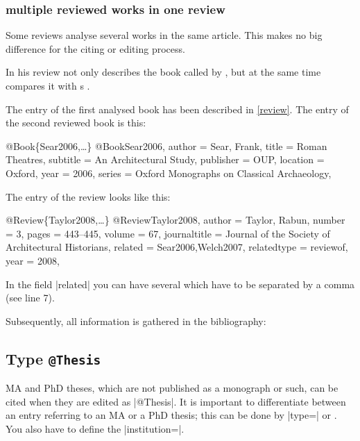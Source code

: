 \documentclass[a4paper,
10pt,
greek,
french,
spanish,
italian,
ngerman,
english
]{ltxdoc}
\begin{document}


\subsubsection{multiple reviewed works in one review}
Some reviews analyse several works in the same article. 
This makes no big difference for the citing or editing process.

In his review
\citeauthor{Taylor2008} not only describes the book called
  by \citeauthor{Welch2007}, 
 but at the same time compares it with \citeauthor{Sear2006}s .

The entry of the first analysed book  has been described in \cref{review}.
The entry of the second reviewed book is this:
\begin{bibexample}[label=Sear2006]{{@}Book\{Sear2006,…\}}
@Book{Sear2006,
  author     = {Sear, Frank},
  title      = {Roman Theatres},
  subtitle   = {An Architectural Study},
  publisher  = OUP,    %
  location   = {Oxford},
  year       = {2006},
  series     = {Oxford Monographs on Classical Archaeology},
}
\end{bibexample}

The entry of the review looks like this:
\begin{bibexample}[label=Taylor2008]{{@}Review\{Taylor2008,…\}}
@Review{Taylor2008,
  author       = {Taylor, Rabun},
  number       = {3},
  pages        = {443--445},
  volume       = {67},
  journaltitle = {Journal of the Society of Architectural Historians},
  related      = {Sear2006,Welch2007},
  relatedtype  = {reviewof},
  year         = {2008},
}
\end{bibexample}
In the field |related| you can have several  which have to be separated by a comma (see line 7).

Subsequently, all information is gathered in the bibliography:


 \subsection{Type \texttt{@Thesis}}\label{thesis}
MA and PhD theses, which are not published as a monograph or such, can be cited when they are edited as |@Thesis|.
It is important to differentiate between an entry referring to an MA or a PhD thesis;
this can be done by |type=| or
 . 
You also have to define the  |institution=|.
 
\end{document}
